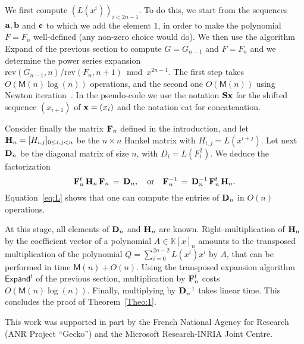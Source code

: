 \documentclass{elsart}
\def\K {\ensuremath{\mathbb{K}}}
\def\M {\ensuremath{\mathsf{M}}}
\def\rev{\mathrm{rev}}
\begin{document}
We first compute $(L(x^i))_{i < 2n-1}$. To do this, we start from the
sequences ${\bf a}, {\bf b}$ and ${\bf c}$ to which we add the element
$1$, in order to make the polynomial $F = F_{n}$ well-defined (any
non-zero choice would do). We then use the algorithm \textsf{Expand}
of the previous section to compute $G = G_{n-1}$ and $F = F_{n}$ and
we determine the power series expansion $\rev(G_{n-1},n)/\rev(F_n,n+1)
\bmod x^{2n-1}$.  The first step takes $O(\M(n)\log(n))$ operations,
and the second one $O(\M(n))$ using Newton iteration~\cite[Chap.~9]{GaGe99}.
In the pseudo-code we use the notation ${\bf Sx}$ for the shifted
sequence $(x_{i+1})$ of ${\bf x} = (x_{i})$ and the notation
\textsf{cat} for concatenation.

Consider finally the matrix ${\bf F}_n$ defined in the introduction,
and let ${\bf H}_n=[H_{i,j}]_{0 \le i,j < n}$ be the $n\times n$
Hankel matrix with $H_{i,j} = L(x^{i+j})$. Let next ${\bf D}_n$ be the
diagonal matrix of size $n$, with $D_i = L(F_i^2)$. We deduce the
factorization $$ {\bf F}_n^t \, {\bf H}_n\, {\bf F}_n \,=\, {\bf D}_n,
\quad\text{or}\quad {\bf F}_n^{-1} \, = \, {\bf D}_n^{-1}\, {\bf
F}_n^t \, {\bf H}_n.$$
Equation~\eqref{eq:L} shows that one can compute the entries of
${\bf D}_n$ in $O(n)$ operations. 

At this stage, all elements of ${\bf D}_n$ and ${\bf H}_n$ are
known. Right-multiplication of ${\bf H}_n$ by the coefficient vector
of a polynomial $A \in \K[x]_n$ amounts to the transposed
multiplication of the polynomial $Q = \sum_{i=0}^{2n-2} L(x^i) x^i$ by
$A$, that can be performed in time $\M(n)+O(n)$. Using the transposed expansion algorithm
$\textsf{Expand}^t$ of the previous section, multiplication by ${\bf
F}_n^t$ costs $O(\M(n)\log(n))$. Finally, multiplying by ${\bf
D}_n^{-1}$ takes linear time. This concludes the proof of Theorem~\ref{Theo:1}.

\smallskip{} This work was supported in part by the French National Agency for Research (ANR Project ``Gecko'') and the Microsoft Research-INRIA Joint Centre.




\end{document}
